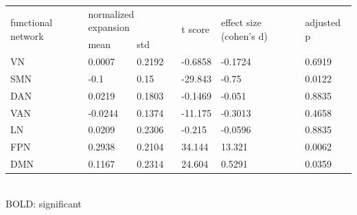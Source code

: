 \begin{refsection}
\begin{table}[H]
\small
{}\selectfont
{} \label{table3S1} 
\begin{tabular}{llllll}
\hline
\multirow{2}{*}{functional network} & \multicolumn{2}{l}{normalized expansion} & \multirow{2}{*}{t score} & \multirow{2}{*}{effect size (cohen's d)} & \multirow{2}{*}{adjusted p} \\ \cline{2-3}
                                    & mean                     & std                    &                          &                                          &                                   \\ \hline 
VN                                  & 0.0007                   & 0.2192                 & -0.6858                  & -0.1724                                  & 0.6919                            \\
SMN                                 & -0.1                     & 0.15                   & -29.843                  & -0.75                                    & 0.0122                            \\
DAN                                 & 0.0219                   & 0.1803                 & -0.1469                  & -0.051                                   & 0.8835                            \\
VAN                                 & -0.0244                  & 0.1374                 & -11.175                  & -0.3013                                  & 0.4658                            \\
LN                                  & 0.0209                   & 0.2306                 & -0.215                   & -0.0596                                  & 0.8835                            \\
FPN                                 & 0.2938                   & 0.2104                 & 34.144                   & 13.321                                   & 0.0062                            \\
DMN                                 & 0.1167                   & 0.2314                 & 24.604                   & 0.5291                                   & 0.0359                            \\ \hline
\end{tabular}\\
{\scriptsize BOLD: significant}
\end{table}



\end{refsection}
